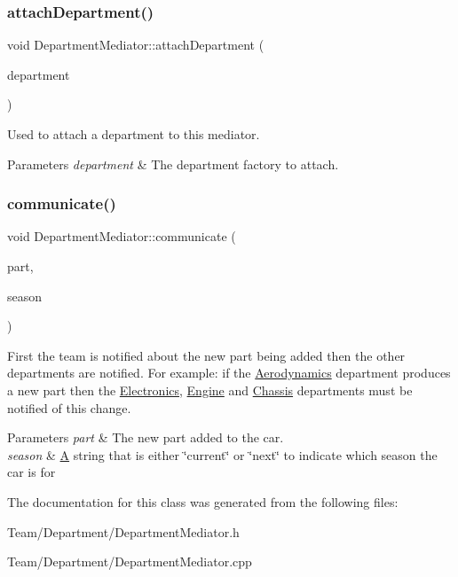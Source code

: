 \subsubsection{\texorpdfstring{attach\+Department()}{attachDepartment()}}
{\footnotesize\ttfamily void Department\+Mediator\+::attach\+Department (\begin{DoxyParamCaption}\item[{\hyperlink{classDepartmentFactory}{Department\+Factory} $\ast$}]{department }\end{DoxyParamCaption})}

Used to attach a department to this mediator. 
\begin{DoxyParams}{Parameters}
{\em department} & The department factory to attach. \\
\hline
\end{DoxyParams}
\mbox{\label{classDepartmentMediator_a1cd1ac08b0aa2d6eb7f31b9fb20155d6}} 
\subsubsection{\texorpdfstring{communicate()}{communicate()}}
{\footnotesize\ttfamily void Department\+Mediator\+::communicate (\begin{DoxyParamCaption}\item[{\hyperlink{classDepartmentOutput}{Department\+Output} $\ast$}]{part,  }\item[{string}]{season }\end{DoxyParamCaption})}

First the team is notified about the new part being added then the other departments are notified. For example\+: if the \hyperlink{classAerodynamics}{Aerodynamics} department produces a new part then the \hyperlink{classElectronics}{Electronics}, \hyperlink{classEngine}{Engine} and \hyperlink{classChassis}{Chassis} departments must be notified of this change. 
\begin{DoxyParams}{Parameters}
{\em part} & The new part added to the car. \\
\hline
{\em season} & \hyperlink{classA}{A} string that is either \char`\"{}current\char`\"{} or \char`\"{}next\char`\"{} to indicate which season the car is for \\
\hline
\end{DoxyParams}


The documentation for this class was generated from the following files\+:\begin{DoxyCompactItemize}
\item 
Team/\+Department/Department\+Mediator.\+h\item 
Team/\+Department/Department\+Mediator.\+cpp\end{DoxyCompactItemize}
